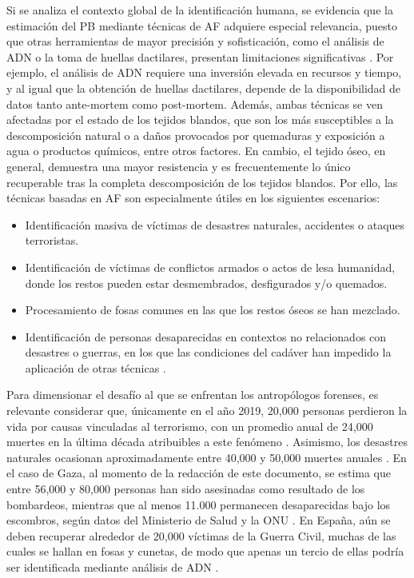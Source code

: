 Si se analiza el contexto global de la identificación humana, se evidencia que la estimación del PB mediante técnicas de AF adquiere especial relevancia, puesto que otras herramientas de mayor precisión y sofisticación, como el análisis de ADN o la toma de huellas dactilares, presentan limitaciones significativas \cite{de_boer_role_2019, beauthier_mass_2009}. Por ejemplo, el análisis de ADN requiere una inversión elevada en recursos y tiempo, y al igual que la obtención de huellas dactilares, depende de la disponibilidad de datos tanto ante-mortem como post-mortem. Además, ambas técnicas se ven afectadas por el estado de los tejidos blandos, que son los más susceptibles a la descomposición natural o a daños provocados por quemaduras y exposición a agua o productos químicos, entre otros factores. En cambio, el tejido óseo, en general, demuestra una mayor resistencia y es frecuentemente lo único recuperable tras la completa descomposición de los tejidos blandos. Por ello, las técnicas basadas en AF son especialmente útiles en los siguientes escenarios:

\begin{itemize}
    \item Identificación masiva de víctimas de desastres naturales, accidentes o ataques terroristas.
    \item Identificación de víctimas de conflictos armados o actos de lesa humanidad, donde los restos pueden estar desmembrados, desfigurados y/o quemados.
    \item Procesamiento de fosas comunes en las que los restos óseos se han mezclado.
    \item Identificación de personas desaparecidas en contextos no relacionados con desastres o guerras, en los que las condiciones del cadáver han impedido la aplicación de otras técnicas \cite{byers_introduction_2016}.
\end{itemize}

Para dimensionar el desafío al que se enfrentan los antropólogos forenses, es relevante considerar que, únicamente en el año 2019, 20,000 personas perdieron la vida por causas vinculadas al terrorismo, con un promedio anual de 24,000 muertes en la última década atribuibles a este fenómeno \cite{owid_terrorism}. Asimismo, los desastres naturales ocasionan aproximadamente entre 40,000 y 50,000 muertes anuales \cite{owid_natural_disasters}. En el caso de Gaza, al momento de la redacción de este documento, se estima que entre 56,000 y 80,000 personas han sido asesinadas como resultado de los bombardeos, mientras que al menos 11.000 permanecen desaparecidas bajo los escombros, según datos del Ministerio de Salud y la ONU \cite{morales_56000_2025}. En España, aún se deben recuperar alrededor de 20,000 víctimas de la Guerra Civil, muchas de las cuales se hallan en fosas y cunetas, de modo que apenas un tercio de ellas podría ser identificada mediante análisis de ADN \cite{junquera_huellas_2022}.

